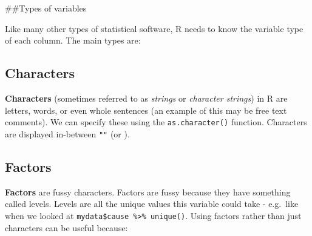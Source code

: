 \documentclass[]{book}
\makeatletter
\newenvironment{Shaded}{\begin{snugshade}}{\end{snugshade}}
\newcommand{\CommentTok}[1]{\textcolor[rgb]{0.56,0.35,0.01}{\textit{#1}}}
\newcommand{\DecValTok}[1]{\textcolor[rgb]{0.00,0.00,0.81}{#1}}
\newcommand{\KeywordTok}[1]{\textcolor[rgb]{0.13,0.29,0.53}{\textbf{#1}}}
\newcommand{\NormalTok}[1]{#1}
\newcommand{\OperatorTok}[1]{\textcolor[rgb]{0.81,0.36,0.00}{\textbf{#1}}}
\newcommand{\StringTok}[1]{\textcolor[rgb]{0.31,0.60,0.02}{#1}}
\newenvironment{kframe}{%
\medskip{}
\setlength{\fboxsep}{.8em}
 \def\at@end@of@kframe{}%
 \ifinner\ifhmode%
  \def\at@end@of@kframe{\end{minipage}}%
  \begin{minipage}{\columnwidth}%
 \fi\fi%
 \def\FrameCommand##1{\hskip\@totalleftmargin \hskip-\fboxsep
 \colorbox{shadecolor}{##1}\hskip-\fboxsep
     \hskip-\linewidth \hskip-\@totalleftmargin \hskip\columnwidth}%
 \MakeFramed {\advance\hsize-\width
   \@totalleftmargin\z@ \linewidth\hsize
   \@setminipage}}%
 {\par\unskip\endMakeFramed%
 \at@end@of@kframe}
\renewenvironment{Shaded}{\begin{kframe}}{\end{kframe}}
\theoremstyle{definition}
\theoremstyle{definition}
\theoremstyle{definition}
\theoremstyle{remark}
\makeatother
\begin{document}
\begin{Shaded}
\end{Shaded}

\#\#Types of variables

Like many other types of statistical software, R needs to know the
variable type of each column. The main types are:

\hypertarget{characters}{%
\subsection{Characters}\label{characters}}

\textbf{Characters} (sometimes referred to as \emph{strings} or
\emph{character strings}) in R are letters, words, or even whole
sentences (an example of this may be free text comments). We can specify
these using the \texttt{as.character()} function. Characters are
displayed in-between \texttt{""} (or
\texttt{\textquotesingle{}\textquotesingle{}}).

\hypertarget{factors}{%
\subsection{Factors}\label{factors}}

\textbf{Factors} are fussy characters. Factors are fussy because they
have something called levels. Levels are all the unique values this
variable could take - e.g.~like when we looked at
\texttt{mydata\$cause\ \%\textgreater{}\%\ unique()}. Using factors
rather than just characters can be useful because:
\end{document}
